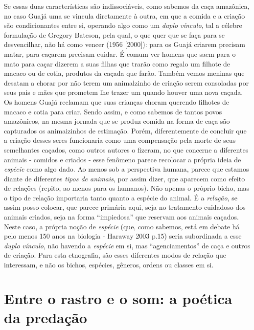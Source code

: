 Se essas duas características são indissociáveis, como sabemos da caça
amazônica, no caso Guajá uma se vincula diretamente à outra, em que a
comida e a criação são condicionantes entre si, operando algo como um
\emph{duplo vínculo}, tal a célebre formulação de Gregory Bateson, pela
qual, o que quer que se faça para se desvencilhar, não há como vencer
(1956 {[}2000{]}): para os Guajá criarem precisam matar, para caçarem
precisam cuidar. É comum ver homens que saem para o mato para caçar
dizerem a suas filhas que trarão como regalo um filhote de macaco ou de
cotia, produtos da caçada que farão. Também vemos meninas que desatam a
chorar por não terem um animalzinho de criação serem consoladas por seus
pais e mães que prometem lhe trazer um quando houver uma nova caçada. Os
homens Guajá reclamam que suas crianças choram querendo filhotes de
macaco e cotia para criar. Sendo assim, e como sabemos de tantos povos
amazônicos, na mesma jornada que se produz comida na forma de caça são
capturados os animaizinhos de estimação. Porém, diferentemente de
concluir que a criação desses seres funcionaria como uma compensação
pela morte de seus semelhantes caçados, como outros autores o fizeram,
no que concerne a diferentes animais - comidos e criados - esse fenômeno
parece recolocar a própria ideia de \emph{espécie} como algo dado. Ao
menos sob a perspectiva humana, parece que estamos diante de diferentes
\emph{tipos de animais}, por assim dizer, que aparecem como efeito de
relações (repito, ao menos para os humanos). Não apenas o próprio bicho,
mas o tipo de relação importaria tanto quanto a espécie do animal. É a
\emph{relação}, se assim posso colocar, que parece primária aqui, seja
no tratamento cuidadoso dos animais criados, seja na forma ``impiedosa''
que reservam aos animais caçados. Neste caso, a própria noção de
\emph{espécie} (que, como sabemos, está em debate há pelo menos 150 anos
na biologia - Haraway 2003 p.15) seria subordinada a esse \emph{duplo
vínculo}, não havendo a \emph{espécie} em si, mas ``agenciamentos'' de
caça e outros de criação. Para esta etnografia, são esses diferentes
modos de relação que interessam, e não os bichos, espécies, gêneros,
ordens ou classes em si.

\section{Entre o rastro e o som: a poética da predação}

